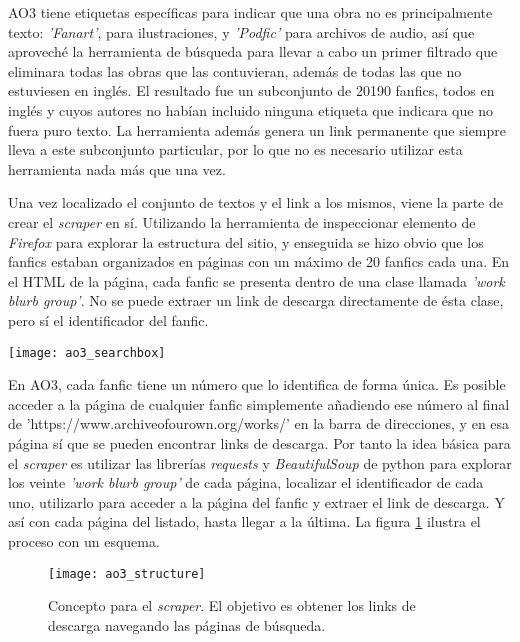 \documentclass{pre-tfg}
\begin{document}
AO3 tiene etiquetas específicas para indicar que una obra no es principalmente texto: \textit{'Fanart'}, para ilustraciones, y \textit{'Podfic'} para archivos de audio, así que aproveché la herramienta de búsqueda para llevar a cabo un primer filtrado que eliminara todas las obras que las contuvieran, además de todas las que no estuviesen en inglés. El resultado fue un subconjunto de 20190 fanfics, todos en inglés y cuyos autores no habían incluido ninguna etiqueta que indicara que no fuera puro texto. La herramienta además genera un link permanente que siempre lleva a este subconjunto particular, por lo que no es necesario utilizar esta herramienta nada más que una vez.

Una vez localizado el conjunto de textos y el link a los mismos, viene la parte de crear el \textit{scraper} en sí. Utilizando la herramienta de inspeccionar elemento de \textit{Firefox} para explorar la estructura del sitio, y enseguida se hizo obvio que los fanfics estaban organizados en páginas con un máximo de 20 fanfics cada una. En el HTML de la página, cada fanfic se presenta dentro de una clase llamada \textit{'work blurb group'}. No se puede extraer un link de descarga directamente de ésta clase, pero sí el identificador del fanfic.


\newpage
\begin{SCfigure}
	\caption{Herramienta de filtrado de AO3. Permite excluir (o incluir) obras que contengan etiquetas específicas, así cómo aquellas no escritas en un idioma particular}
	\label{fig:ao3_search}
	\texttt{[image: ao3\_searchbox]}
	\centering
\end{SCfigure}


En AO3, cada fanfic tiene un número que lo identifica de forma única. Es posible acceder a la página de cualquier fanfic simplemente añadiendo ese número al final de \newline 'https://www.archiveofourown.org/works/' en la barra de direcciones, y en esa página sí que se pueden encontrar links de descarga.
Por tanto la idea básica para el \textit{scraper} es utilizar las librerías \textit{requests} y \textit{BeautifulSoup} de python para explorar los veinte \textit{'work blurb group'} de cada página, localizar el identificador de cada uno, utilizarlo para acceder a la página del fanfic y extraer el link de descarga. Y así con cada página del listado, hasta llegar a la última. La figura \ref{fig:ao3_structure} ilustra el proceso con un esquema.

\begin{figure}[h]
	\texttt{[image: ao3\_structure]}
	\caption{Concepto para el \textit{scraper}. El objetivo es obtener los links de descarga navegando las páginas de búsqueda.}
	\label{fig:ao3_structure}
	\centering
\end{figure}
\end{document}
